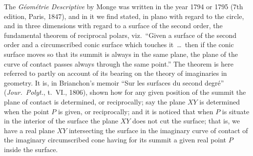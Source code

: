 \documentclass[12pt,a4paper,oneside]{book}
\begin{document}
\newpage
The \textit{G\'eom\'etrie Descriptive} by Monge was written in the year 1794 or 1795 (7th edition, Paris, 1847), and in it we find stated, in plano with regard to the circle, and in three dimensions with regard to a surface of the second order, the fundamental theorem of reciprocal polars, viz.\ ``Given a surface of the second order and a circumscribed conic surface which touches it~\dots\ then if the conic surface moves so that its summit is always in the same plane, the plane of the curve of contact passes always through the same point.'' The theorem is here referred to partly on account of its bearing on the theory of imaginaries in geometry. It is, in Brianchon's memoir ``Sur les surfaces du second degr\'e'' (\textit{Jour.\ Polyt.}, t.~VI., 1806), shown how for any given position of the summit the plane of contact is determined, or reciprocally; say the plane $XY$ is determined when the point $P$ is given, or reciprocally; and it is noticed that when $P$ is situate in the interior of the surface the plane $XY$ does not cut the surface; that is, we have a real plane $XY$ intersecting the surface in the imaginary curve of contact of the imaginary circumscribed cone having for its summit a given real point $P$ inside the surface.
\end{document}
